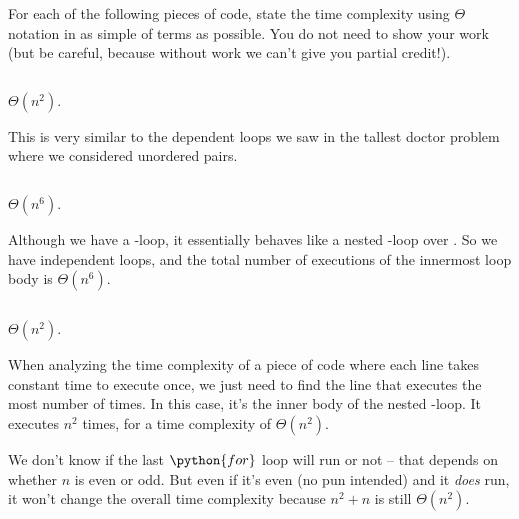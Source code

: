 \begin{prob}
    For each of the following pieces of code, state the time complexity using
    $\Theta$ notation in as simple of terms as possible. You do not need to
    show your work (but be careful, because without work we can't give you
    partial credit!).

    \begin{subprobset}

        \begin{subprob}
            \inputminted{python}{\thisdir/include/part_a.py}

            \begin{soln}
                $\Theta(n^2)$.

                This is very similar to the dependent loops we saw in the
                tallest doctor problem where we considered unordered pairs.
            \end{soln}
        \end{subprob}

        \begin{subprob}
            \inputminted{python}{\thisdir/include/part_b.py}

            \begin{soln}
                $\Theta(n^6)$.

                Although we have a -loop, it essentially
                behaves like a nested -loop over .
                So we have independent loops, and the total number of executions
                of the innermost loop body is $\Theta(n^6)$.
            \end{soln}
        \end{subprob}

        \begin{subprob}
            \inputminted{python}{\thisdir/include/part_c.py}

            \begin{soln}
                $\Theta(n^2)$.

                When analyzing the time complexity of a piece of code where
                each line takes constant time to execute once, we just need to find the line
                that executes the most number of times. In this case, it's the
                inner body of the nested -loop. It executes $n^2$ times, for
                a time complexity of $\Theta(n^2)$.

                We don't know if the last $\python{for}$ loop will run or not
                -- that depends on whether $n$ is even or odd. But even if it's
                even (no pun intended) and it \emph{does} run, it won't change
                the overall time complexity because $n^2 + n$ is still
                $\Theta(n^2)$.
            \end{soln}
        \end{subprob}


\end{subprobset}
\end{prob}
